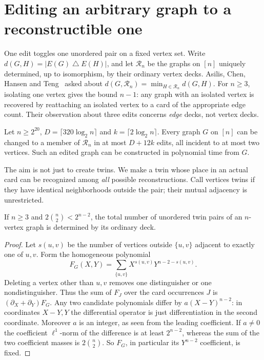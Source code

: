 \section{Editing an arbitrary graph to a reconstructible one}\label{edit:toward}
One edit toggles one unordered pair on a fixed vertex set. Write
$d(G,H)=|E(G)\mathbin{\triangle} E(H)|$, and let $\mathcal R_n$ be the
graphs on $[n]$ uniquely determined, up to isomorphism, by their ordinary
vertex decks. Asilis, Chen, Hansen and Teng~\cite[Section~4, p.~12:15]{acht}
asked about $d(G,\mathcal R_n)=\min_{H\in\mathcal R_n}d(G,H)$. For $n\ge3$, isolating
one vertex gives the bound $n-1$: any graph with an isolated vertex is recovered by
reattaching an isolated vertex to a card of the appropriate edge count.
Their observation about three edits concerns \emph{edge} decks, not vertex
decks.

\begin{theorem}\label{edit:cover}
Let $n\ge 2^{20}$, $D=\lceil320\log_2 n\rceil$ and $k=\lceil2\log_2 n\rceil$.
Every graph $G$ on $[n]$ can be changed to a member of $\mathcal R_n$ in
at most $D+12k$ edits, all incident to at most two vertices. Such an
edited graph can be constructed in polynomial time from $G$.
\end{theorem}

The aim is not just to create twins. We make a twin whose place in an
actual card can be recognized among \emph{all} possible reconstructions.
Call vertices twins if they have identical neighborhoods outside the pair;
their mutual adjacency is unrestricted.

\begin{lemma}\label{edit:twins}
If $n\ge3$ and $2\binom n2<2^{n-2}$, the total number of unordered twin pairs of an
$n$-vertex graph is determined by its ordinary deck.
\end{lemma}
\begin{proof}
Let $s(u,v)$ be the number of vertices outside $\{u,v\}$ adjacent to exactly
one of $u,v$. Form the homogeneous polynomial
\[
 F_G(X,Y)=\sum_{\{u,v\}} X^{s(u,v)}Y^{n-2-s(u,v)} .
\]
Deleting a vertex other than $u,v$ removes one distinguisher or one
nondistinguisher. Thus the sum of $F_J$ over the card occurrences $J$
is $(\partial_X+\partial_Y)F_G$. Any two candidate polynomials differ
by $a(X-Y)^{n-2}$: in coordinates $X-Y,Y$ the differential operator is
just differentiation in the second coordinate. Moreover $a$ is an integer,
as seen from the leading coefficient. If $a\ne0$ the coefficient
$\ell^1$-norm of the difference is at least $2^{n-2}$, whereas the sum
of the two coefficient masses is $2\binom n2$. So $F_G$, in particular
its $Y^{n-2}$ coefficient, is fixed.
\end{proof}

